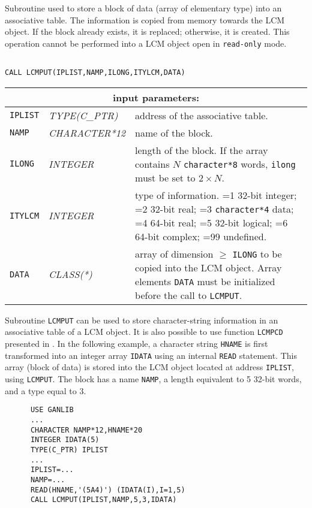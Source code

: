 Subroutine used to store a block of data (array of elementary type) into an associative table. 
The information is copied from memory towards the LCM object. If the block already exists, it is replaced;
otherwise, it is created. This operation cannot be performed into a LCM object open in {\tt read-only} mode.

\begin{verbatim}

CALL LCMPUT(IPLIST,NAMP,ILONG,ITYLCM,DATA)
\end{verbatim}

\noindent
\begin{tabular}{|p{1.5cm}|p{3cm}|p{10cm}|}
\hline
\multicolumn{3}{|c|}{\bf input parameters:} \\
\hline
{\tt IPLIST} & {\it TYPE(C\_PTR)} & address of the associative table. \\
\hline
{\tt NAMP} & {\it CHARACTER*12} & name of the block. \\
\hline
{\tt ILONG} & {\it INTEGER} & length of the block. If the array contains $N$ {\tt character*8} words, 
                                   {\tt ilong} must be set to $2 \times N$. \\
\hline
{\tt ITYLCM} & {\it INTEGER} & type of information. =1 32-bit integer; 
                                    =2 32-bit real; =3 {\tt character*4} data; 
				    =4 64-bit real; =5 32-bit logical; =6 64-bit complex; =99 undefined. \\
\hline
{\tt DATA} & {\it CLASS(*)} & array of dimension $\ge$ {\tt ILONG} to be copied into the LCM object. 
                                   Array elements {\tt DATA} must be initialized before the call to {\tt LCMPUT}. \\
\hline
\end{tabular}

\vskip 0.4cm

Subroutine {\tt LCMPUT} can be used to store character-string information in an associative table of a LCM object.
It is also possible to use function {\tt LCMPCD} presented in . In the
following example, a character string {\tt HNAME} is first transformed into an integer array {\tt IDATA}
using an internal {\tt READ} statement. This array (block of data) is stored into the LCM object located at
address {\tt IPLIST}, using {\tt LCMPUT}. The block has a name {\tt NAMP}, a length equivalent to 5 32-bit words, and a type
equal to 3.

\begin{verbatim}
      USE GANLIB
      ...
      CHARACTER NAMP*12,HNAME*20
      INTEGER IDATA(5)
      TYPE(C_PTR) IPLIST
      ...
      IPLIST=...
      NAMP=...
      READ(HNAME,'(5A4)') (IDATA(I),I=1,5)
      CALL LCMPUT(IPLIST,NAMP,5,3,IDATA)
\end{verbatim}

